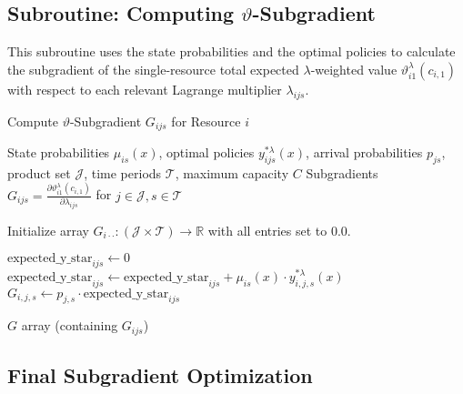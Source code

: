 \documentclass[11pt]{article}
\newcommand{\R}{\mathbb{R}}
\begin{document}
\subsection{Subroutine: Computing $\vartheta$-Subgradient}

\noindent
This subroutine uses the state probabilities and the optimal policies to calculate the subgradient of the single-resource total expected $\lambda$-weighted value $\vartheta^\lambda_{i1}(c_{i,1})$ with respect to each relevant Lagrange multiplier $\lambda_{ijs}$.

\begin{algorithm}[H]
\caption{Compute $\vartheta$-Subgradient $G_{ijs}$ for Resource $i$}
\label{alg:compute_subgrad_vartheta}
\begin{algorithmic}[1]
\Require State probabilities $\mu_{is}(x)$, optimal policies $y^{*\lambda}_{ijs}(x)$, arrival probabilities $p_{js}$, product set $\mathcal{J}$, time periods $\mathcal{T}$, maximum capacity $C$
\Ensure Subgradients $G_{ijs} = \frac{\partial \vartheta^\lambda_{i1}(c_{i,1})}{\partial \lambda_{ijs}}$ for $j \in \mathcal{J}, s \in \mathcal{T}$

\State Initialize array $G_{i \cdot \cdot} : (\mathcal{J} \times \mathcal{T}) \to \R$ with all entries set to $0.0$.

 
     
        \State $\text{expected\_y\_star}_{ijs} \gets 0$
         
             
                \State $\text{expected\_y\_star}_{ijs} \gets \text{expected\_y\_star}_{ijs} + \mu_{is}(x) \cdot y^{*\lambda}_{i,j,s}(x)$
            \EndIf
        \EndFor
        \State $G_{i,j,s} \gets p_{j,s} \cdot \text{expected\_y\_star}_{ijs}$
    \EndFor
\EndFor

\State \Return $G$ array (containing $G_{ijs}$)
\end{algorithmic}
\end{algorithm}



\newpage

\subsection{Final Subgradient Optimization}
\end{document}
